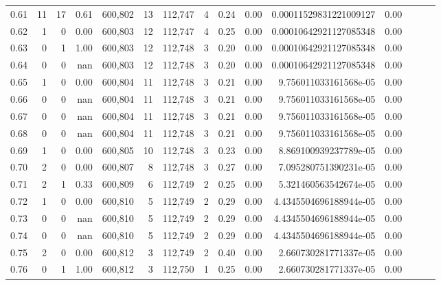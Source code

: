 \begin{tabular}{rrrrrrrrrrrrrrr}
0.61 &      11 &     17 &  0.61 &  600,802 &       13 &  112,747 &        4 &  0.24 &  0.00 &  0.00011529831221009127 &      0.00 \\
0.62 &       1 &      0 &  0.00 &  600,803 &       12 &  112,747 &        4 &  0.25 &  0.00 &  0.00010642921127085348 &      0.00 \\
0.63 &       0 &      1 &  1.00 &  600,803 &       12 &  112,748 &        3 &  0.20 &  0.00 &  0.00010642921127085348 &      0.00 \\
0.64 &       0 &      0 &   nan &  600,803 &       12 &  112,748 &        3 &  0.20 &  0.00 &  0.00010642921127085348 &      0.00 \\
0.65 &       1 &      0 &  0.00 &  600,804 &       11 &  112,748 &        3 &  0.21 &  0.00 &   9.756011033161568e-05 &      0.00 \\
0.66 &       0 &      0 &   nan &  600,804 &       11 &  112,748 &        3 &  0.21 &  0.00 &   9.756011033161568e-05 &      0.00 \\
0.67 &       0 &      0 &   nan &  600,804 &       11 &  112,748 &        3 &  0.21 &  0.00 &   9.756011033161568e-05 &      0.00 \\
0.68 &       0 &      0 &   nan &  600,804 &       11 &  112,748 &        3 &  0.21 &  0.00 &   9.756011033161568e-05 &      0.00 \\
0.69 &       1 &      0 &  0.00 &  600,805 &       10 &  112,748 &        3 &  0.23 &  0.00 &   8.869100939237789e-05 &      0.00 \\
0.70 &       2 &      0 &  0.00 &  600,807 &        8 &  112,748 &        3 &  0.27 &  0.00 &   7.095280751390231e-05 &      0.00 \\
0.71 &       2 &      1 &  0.33 &  600,809 &        6 &  112,749 &        2 &  0.25 &  0.00 &   5.321460563542674e-05 &      0.00 \\
0.72 &       1 &      0 &  0.00 &  600,810 &        5 &  112,749 &        2 &  0.29 &  0.00 &  4.4345504696188944e-05 &      0.00 \\
0.73 &       0 &      0 &   nan &  600,810 &        5 &  112,749 &        2 &  0.29 &  0.00 &  4.4345504696188944e-05 &      0.00 \\
0.74 &       0 &      0 &   nan &  600,810 &        5 &  112,749 &        2 &  0.29 &  0.00 &  4.4345504696188944e-05 &      0.00 \\
0.75 &       2 &      0 &  0.00 &  600,812 &        3 &  112,749 &        2 &  0.40 &  0.00 &   2.660730281771337e-05 &      0.00 \\
0.76 &       0 &      1 &  1.00 &  600,812 &        3 &  112,750 &        1 &  0.25 &  0.00 &   2.660730281771337e-05 &      0.00 \\

\end{tabular}
